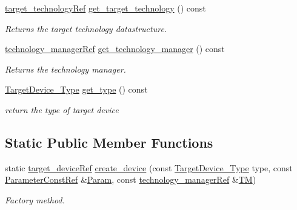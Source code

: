 \begin{DoxyCompactItemize}
\hyperlink{target__technology_8hpp_a16af97aadc4eb998c2c9ec7fba5ccecd}{target\+\_\+technology\+Ref} \hyperlink{classtarget__device_afe3565642b50b7a6be23f7521c4d966e}{get\+\_\+target\+\_\+technology} () const
\begin{DoxyCompactList}\small\item\em Returns the target technology datastructure. \end{DoxyCompactList}\item 
\hyperlink{technology__manager_8hpp_a4b9ecd440c804109c962654f9227244e}{technology\+\_\+manager\+Ref} \hyperlink{classtarget__device_a66e29854522d999a5ab9b8f74baeebff}{get\+\_\+technology\+\_\+manager} () const
\begin{DoxyCompactList}\small\item\em Returns the technology manager. \end{DoxyCompactList}\item 
\hyperlink{target__device_8hpp_a476becc690220f0805ce73006449c732}{Target\+Device\+\_\+\+Type} \hyperlink{classtarget__device_ad99d9910849ae26b259a7c8d67f8aa5e}{get\+\_\+type} () const
\begin{DoxyCompactList}\small\item\em return the type of target device \end{DoxyCompactList}\end{DoxyCompactItemize}
\subsection*{Static Public Member Functions}
\begin{DoxyCompactItemize}
\item 
static \hyperlink{target__device_8hpp_acedb2b7a617e27e6354a8049fee44eda}{target\+\_\+device\+Ref} \hyperlink{classtarget__device_a3022132189bcc9f25d4f9091609d461c}{create\+\_\+device} (const \hyperlink{target__device_8hpp_a476becc690220f0805ce73006449c732}{Target\+Device\+\_\+\+Type} type, const \hyperlink{Parameter_8hpp_a37841774a6fcb479b597fdf8955eb4ea}{Parameter\+Const\+Ref} \&\hyperlink{classtarget__device_a2ab6118c487cc65cf7fe3462c96967ec}{Param}, const \hyperlink{technology__manager_8hpp_a4b9ecd440c804109c962654f9227244e}{technology\+\_\+manager\+Ref} \&\hyperlink{classtarget__device_a941853b670a1b34eae7eab6bd21c854a}{TM})
\begin{DoxyCompactList}\small\item\em Factory method. \end{DoxyCompactList}\end{DoxyCompactItemize}
